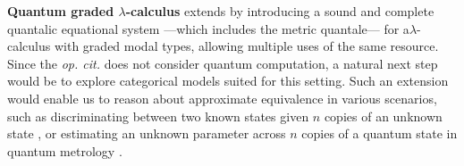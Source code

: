 \begin{comment}
\[
\hspace{-110pt}
\begin{minipage}{0.45\textwidth}
\centering
\begin{tikzpicture}
  \matrix (m) [matrix of math nodes,row sep=3em,column sep=2em,minimum width=1em]
  { 
    \bigoplus_i M_{n_i} \\
     \bigoplus_j M_{n_j}   \\
  };
  \path[-stealth]
    (m-1-1) edge  node [right] {$\Phi$} (m-2-1);
\end{tikzpicture}
\end{minipage}
\hspace{-60pt}
\begin{minipage}{0.45\textwidth}
\centering
\begin{tikzpicture}
  \matrix (m) [matrix of math nodes,row sep=3em,column sep=23em,minimum width=1em]
  {
  (\bigoplus_i M_{n_i})^*&  \bigoplus_i M_{n_i} \\
   (\bigoplus_j M_{n_j})^* &  \bigoplus_j M_{n_j} \\
  };
  \path[-stealth]
    (m-1-1) edge  node [above] {$\varphi \mapsto \left(\sum_{ij} \varphi_1(\ket{j}\bra{i}) \cdot \ket{i} \bra{j}, \ldots, \sum_{ij} \varphi_n(\ket{j}\bra{i}) \cdot \ket{i} \bra{j}\right)   $} (m-1-2)
    (m-2-2) edge [dotted]  node [right] {$\Phi^*$} (m-1-2)
    (m-2-2) edge  node [below] {$ A \mapsto (B \mapsto \tr(AB)) $} (m-2-1)
    (m-2-1) edge  node [right] {$ \varphi \mapsto \varphi \cdot \Phi $} (m-1-1)
    ;
\end{tikzpicture}
\end{minipage}
\]
where $\varphi \in (\bigoplus_i M_{n_i})^*$ is defined as $\varphi(v_1, \ldots, v_n)= \sum_i^n \varphi_i(v_i).$


\vspace{3pt}
\end{comment}


\textbf{Quantum graded $\lambda$-calculus}
  \cite{dahlqvistCompleteVEquationalSystem2023} extends  \cite{dahlqvist2023syntactic} by introducing a sound and complete quantalic equational system ---which includes the metric quantale--- for a$\lambda$-calculus with graded modal types, allowing multiple uses of the same resource. Since the \textit{op. cit.} \cite{dahlqvistCompleteVEquationalSystem2023} does not consider quantum computation, a natural next step would be to explore categorical models suited for this setting. Such an extension would enable us to reason about approximate equivalence in various scenarios, such as discriminating between two known states given $n$ copies of an unknown state \cite{Multiple_copy_two_state_discrimination}, or estimating an unknown parameter across $n$ copies of a quantum state in quantum metrology \cite{Giovannetti_Quantum_Metrology, Zhou_Limits_Noisy_Quantum_Metrology}.

